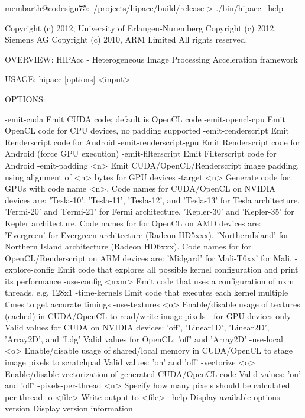 \lstset{language=bash}
\begin{code}
membarth@codesign75:~/projects/hipacc/build/release > ./bin/hipacc --help

Copyright (c) 2012, University of Erlangen-Nuremberg
Copyright (c) 2012, Siemens AG
Copyright (c) 2010, ARM Limited
All rights reserved.

OVERVIEW: HIPAcc - Heterogeneous Image Processing Acceleration framework

USAGE:  hipacc [options] <input>

OPTIONS:

  -emit-cuda              Emit CUDA code; default is OpenCL code
  -emit-opencl-cpu        Emit OpenCL code for CPU devices, no padding supported
  -emit-renderscript      Emit Renderscript code for Android
  -emit-renderscript-gpu  Emit Renderscript code for Android (force GPU execution)
  -emit-filterscript      Emit Filterscript code for Android
  -emit-padding <n>       Emit CUDA/OpenCL/Renderscript image padding, using alignment of <n> bytes for GPU devices
  -target <n>             Generate code for GPUs with code name <n>.
                          Code names for CUDA/OpenCL on NVIDIA devices are:
                            'Tesla-10', 'Tesla-11', 'Tesla-12', and 'Tesla-13' for Tesla architecture.
                            'Fermi-20' and 'Fermi-21' for Fermi architecture.
                            'Kepler-30' and 'Kepler-35' for Kepler architecture.
                          Code names for for OpenCL on AMD devices are:
                            'Evergreen'      for Evergreen architecture (Radeon HD5xxx).
                            'NorthernIsland' for Northern Island architecture (Radeon HD6xxx).
                          Code names for for OpenCL/Renderscript on ARM devices are:
                            'Midgard' for Mali-T6xx' for Mali.
  -explore-config         Emit code that explores all possible kernel configuration and print its performance
  -use-config <nxm>       Emit code that uses a configuration of nxm threads, e.g. 128x1
  -time-kernels           Emit code that executes each kernel multiple times to get accurate timings
  -use-textures <o>       Enable/disable usage of textures (cached) in CUDA/OpenCL to read/write image pixels - for GPU devices only
                          Valid values for CUDA on NVIDIA devices: 'off', 'Linear1D', 'Linear2D', 'Array2D', and 'Ldg'
                          Valid values for OpenCL: 'off' and 'Array2D'
  -use-local <o>          Enable/disable usage of shared/local memory in CUDA/OpenCL to stage image pixels to scratchpad
                          Valid values: 'on' and 'off'
  -vectorize <o>          Enable/disable vectorization of generated CUDA/OpenCL code
                          Valid values: 'on' and 'off'
  -pixels-per-thread <n>  Specify how many pixels should be calculated per thread
  -o <file>               Write output to <file>
  --help                  Display available options
  --version               Display version information
\end{code}



